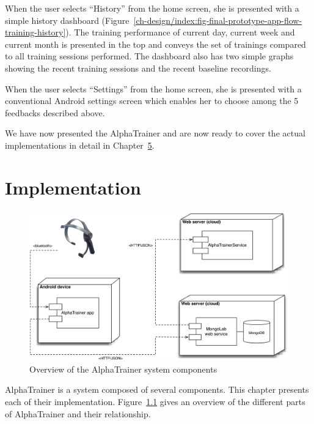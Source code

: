 \documentclass[a4paper,10pt,english,lof,lot,twoside]{puthesis}
\begin{document}
When the user selects ``History'' from the home screen, she is presented with a
simple history dashboard (Figure \ref{ch-design/index:fig-final-prototype-app-flow-training-history}). The training performance
of current day, current week and current month is presented in the top and
conveys the set of trainings compared to all training sessions performed. The
dashboard also has two simple graphs showing the recent training sessions and
the recent baseline recordings.

When the user selects ``Settings'' from the home screen, she is presented with a
conventional Android settings screen which enables her to choose among the 5
feedbacks described above.

We have now presented the AlphaTrainer and are now ready to cover the actual
implementations in detail in Chapter {\hyperref[ch-implementation/index:ch-implementation]{5}}.


\chapter{Implementation}
\label{ch-implementation/index:implementation}\label{ch-implementation/index:ch-implementation}\label{ch-implementation/index::doc}\begin{figure}[tbp]
\centering
\capstart

\includegraphics[width=1.000\linewidth]{alphatrainer-system-overview.png}
\caption[AlphaTrainer system overview]{Overview of the AlphaTrainer system components}\label{ch-implementation/index:fig-implementation-alphatrainer-system-overview}\end{figure}

AlphaTrainer is a system composed of several components. This chapter presents
each of their implementation. Figure \ref{ch-implementation/index:fig-implementation-alphatrainer-system-overview} gives an overview of
the different parts of AlphaTrainer and their relationship.
\end{document}
